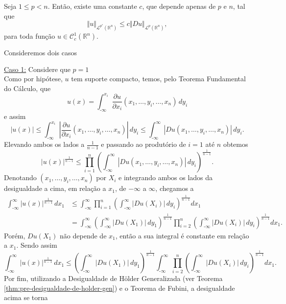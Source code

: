\documentclass[a4paper, 11pt]{book}
\theoremstyle{definition}
\newcommand{\m}{\text{-}}
\newcommand{\bR}{\mathbb{R}}
\newcommand{\cC}{\mathcal{C}}
\newcommand{\cL}{\mathcal{L}}
\begin{document}
\begin{tbox} Seja $1 \leqslant p < n$. Então, existe uma constante $c$, que depende apenas de $p$ e $n$, tal que
\begin{equation} \label{eq:gns}
    \Vert u \Vert_{\cL^{p^*}(\bR^n)} \leqslant c \Vert Du \Vert_{\cL^p(\bR^n)},
\end{equation}
para toda função $u \in \cC^1_c(\bR^n)$.
\end{tbox}
\begin{prf}
    Consideremos dois casos

    \underline{Caso 1:} Considere que $p = 1$\\
    Como por hipótese, $u$ tem suporte compacto, temos, pelo Teorema Fundamental do Cálculo, que
    \[
        u(x) = \int_{\m\infty}^{x_i} \dfrac{\partial u}{\partial x_i}(x_1,\dots,y_i,\dots,x_n) \, dy_i
    \]
    e assim
    \[
        |u(x)| \leqslant \int_{\m\infty}^{x_i} \left|\dfrac{\partial u}{\partial x_i}(x_1,\dots,y_i,\dots,x_n)\right| \, dy_i  \leqslant \int_{\m\infty}^{\infty} \left| Du(x_1,\dots,y_i,\dots,x_n) \right| \,dy_i.
    \]
    Elevando ambos os lados a $\frac{1}{n-1}$ e passando ao produtório de $i = 1$ até $n$ obtemos
    \[
        |u(x)|^{\frac{1}{n-1}} \leqslant \prod_{i=1}^n \left( \int_{\m\infty}^{\infty} |Du(x_1,\dots,y_i,\dots,x_n)| \,dy_i \right)^{\frac{1}{n-1}}.
    \]
    Denotando $(x_1,\dots,y_i,\dots,x_n)$ por $X_i$ e integrando ambos os lados da desigualdade a cima, em relação a $x_1$, de $-\infty$ a $\infty$, chegamos a
    \[
        \begin{aligned}
            \int_{\m\infty}^{\infty} |u(x)|^{\frac{1}{n-1}} \,dx_1 &\leqslant \int_{\m\infty}^{\infty} \prod_{i=1}^n \left( \int_{\m\infty}^{\infty} |Du(X_i)| \,dy_i \right)^{\frac{1}{n-1}}  dx_1\\ 
            &= \int_{\m\infty}^{\infty} \left( \int_{\m\infty}^{\infty} |Du(X_1)| \,dy_1 \right)^{\frac{1}{n-1}}  \prod_{i=2}^n \left(\int_{\m\infty}^{\infty} |Du(X_i)| \, dy_i\right)^{\frac{1}{n-1}} dx_1.
        \end{aligned}
    \]
    Porém, $Du(X_1)$ não depende de $x_1$, então a sua integral é constante em relação a $x_1$. Sendo assim
    \[
        \int_{\m\infty}^{\infty} |u(x)|^{\frac{1}{n-1}} \,dx_1 \leqslant \left( \int_{\m\infty}^{\infty} |Du(X_1)| \,dy_1 \right)^{\frac{1}{n-1}}\int_{\m\infty}^{\infty}   \prod_{i=2}^n \left(\int_{\m\infty}^{\infty} |Du(X_i)| \, dy_i\right)^{\frac{1}{n-1}} dx_1.
    \]
    Por fim, utilizando a Desigualdade de Hölder Generalizada (ver Teorema \ref{thm:pre-desigualdade-de-holder-gen}) e o Teorema de Fubini, a desigualdade acima se torna

\end{prf}
\end{document}
